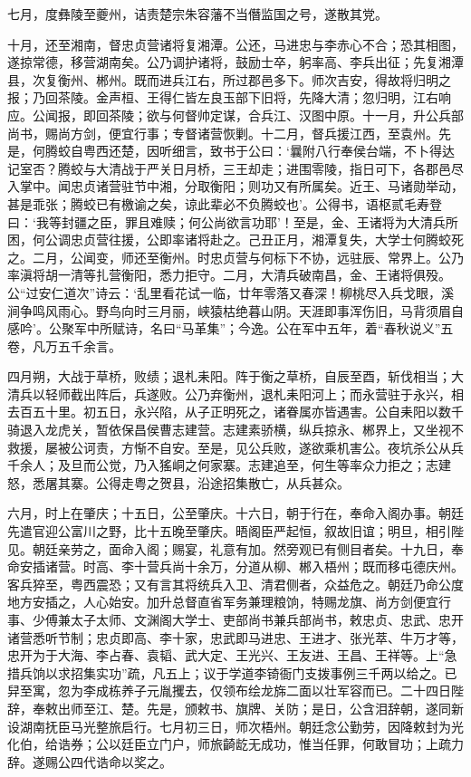 \documentclass[]{article}
\begin{document}
七月，度彝陵至夔州，诘责楚宗朱容藩不当僭监国之号，遂散其党。

十月，还至湘南，督忠贞营诸将复湘潭。公还，马进忠与李赤心不合；恐其相图，遂掠常德，移营湖南矣。公乃调护诸将，鼓励士卒，躬率高、李兵出征；先复湘潭县，次复衡州、郴州。既而进兵江右，所过郡邑多下。师次吉安，得故将归明之报；乃回茶陵。金声桓、王得仁皆左良玉部下旧将，先降大清；忽归明，江右响应。公闻报，即回茶陵；欲与何督帅定谋，合兵江、汉图中原。十一月，升公兵部尚书，赐尚方剑，便宜行事；专督诸营恢剿。十二月，督兵援江西，至袁州。先是，何腾蛟自粤西还楚，因听细言，致书于公曰：`曩附八行奉侯台端，不卜得达记室否？腾蛟与大清战于严关日月桥，三王却走；进围零陵，指日可下，各郡邑尽入掌中。闻忠贞诸营驻节中湘，分取衡阳；则功又有所属矣。近王、马诸勋举动，甚是乖张；腾蛟已有檄谕之矣，谅此辈必不负腾蛟也'。公得书，语枢贰毛寿登曰：`我等封疆之臣，罪且难赎；何公尚欲言功耶'！至是，金、王诸将为大清兵所困，何公调忠贞营往援，公即率诸将赴之。己丑正月，湘潭复失，大学士何腾蛟死之。二月，公闻变，师还至衡州。时忠贞营与何标下不协，远驻辰、常界上。公乃率滇将胡一清等扎营衡阳，悉力拒守。二月，大清兵破南昌，金、王诸将俱殁。公``过安仁道次''诗云：`乱里看花试一临，廿年零落又春深！柳桃尽入兵戈眼，溪涧争鸣风雨心。野鸟向时三月丽，峡猿枯绝暮山阴。天涯即事浑伤旧，马背须眉自感吟'。公聚军中所赋诗，名曰``马革集''；今逸。公在军中五年，着``春秋说义''五卷，凡万五千余言。

四月朔，大战于草桥，败绩；退札耒阳。阵于衡之草桥，自辰至酉，斩伐相当；大清兵以轻师截出阵后，兵遂败。公乃弃衡州，退札耒阳河上；而永营驻于永兴，相去百五十里。初五日，永兴陷，从子正明死之，诸眷属亦皆遇害。公自耒阳以数千骑退入龙虎关，暂依保昌侯曹志建营。志建素骄横，纵兵掠永、郴界上，又坐视不救援，屡被公诃责，方惭不自安。至是，见公兵败，遂欲乘机害公。夜坑杀公从兵千余人；及旦而公觉，乃入猺峒之何家寨。志建追至，何生等率众力拒之；志建怒，悉屠其寨。公得走粤之贺县，沿途招集散亡，从兵甚众。

六月，时上在肇庆；十五日，公至肇庆。十六日，朝于行在，奉命入阁办事。朝廷先遣官迎公富川之野，比十五晚至肇庆。晤阁臣严起恒，叙故旧谊；明旦，相引陛见。朝廷亲劳之，面命入阁；赐宴，礼意有加。然旁观已有侧目者矣。十九日，奉命安插诸营。时高、李十营兵尚十余万，分道从柳、郴入梧州；既而移屯德庆州。客兵猝至，粤西震恐；又有言其将统兵入卫、清君侧者，众益危之。朝廷乃命公度地方安插之，人心始安。加升总督直省军务兼理粮饷，特赐龙旗、尚方剑便宜行事、少傅兼太子太师、文渊阁大学士、吏部尚书兼兵部尚书，敕忠贞、忠武、忠开诸营悉听节制；忠贞即高、李十家，忠武即马进忠、王进才、张光萃、牛万才等，忠开为于大海、李占春、袁韬、武大定、王光兴、王友进、王昌、王祥等。上``急措兵饷以求招集实功''疏，凡五上；议于学道李锜衙门支拨事例三千两以给之。已舁至寓，忽为李成栋养子元胤攫去，仅领布绘龙旆二面以壮军容而已。二十四日陛辞，奉敕出师至江、楚。先是，颁敕书、旗牌、关防；是日，公含泪辞朝，遂同新设湖南抚臣马光整旅启行。七月初三日，师次梧州。朝廷念公勤劳，因降敕封为光化伯，给诰券；公以廷臣立门户，师旅齮龁无成功，惟当任罪，何敢冒功；上疏力辞。遂赐公四代诰命以奖之。
\end{document}
